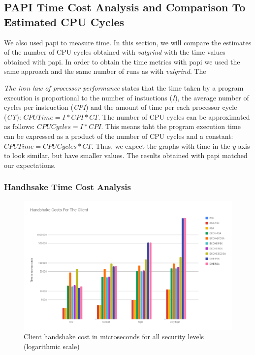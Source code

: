 \subsection{PAPI Time Cost Analysis and Comparison To Estimated CPU Cycles }

We also used \gls{papi} to measure time. In this section, we will compare the estimates of the number of CPU cycles
obtained with \textit{valgrind} with the time values obtained with \gls{papi}. In order to obtain the time metrics with
\gls{papi} we used the same approach and the same number of runs as with \textit{valgrind}. The 

\textit{The iron law of processor performance}\cite{yadin2016computer} states that the time
taken by a program execution is proportional to the number of instuctions (\textit{I}), 
the average number of cycles per instruction (\textit{CPI}) and the amount of time per each processor
cycle (\textit{CT}): $CPU Time = I * CPI * CT$. The number of CPU cycles can be approximated as 
follows: $CPU Cycles = I * CPI$. This means taht the program execution time can be expressed 
as a product of the number of CPU cycles and a constant: $CPU Time = CPU Cycles * CT$.
Thus, we expect the graphs with time in the $y$ axis to look similar, but have smaller
values. The results obtained with \gls{papi} matched our expectations.

\subsubsection{Handhsake Time Cost Analysis} \label{sec:papi-handshake}

\begin{figure}
  \centering
  \includegraphics[width=1.0\textwidth]{img/hs_papi_client.png}
  \centering \caption{\label{fig:client-hs-cost-all-sls-papi} Client handshake cost in microseconds for all security levels (logarithmic scale)}
\end{figure}

